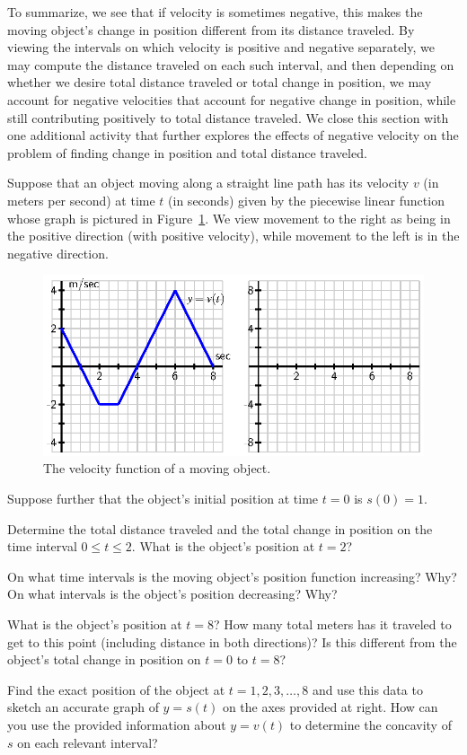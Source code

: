 To summarize, we see that if velocity is sometimes negative, this makes the moving object's change in position different from its distance traveled.  By viewing the intervals on which velocity is positive and negative separately, we may compute the distance traveled on each such interval, and then depending on whether we desire total distance traveled or total change in position, we may account for negative velocities that account for negative change in position, while still contributing positively to total distance traveled.  We close this section with one additional activity that further explores the effects of negative velocity on the problem of finding change in position and total distance traveled.

\begin{activity} \label{A:4.1.3}  Suppose that an object moving along a straight line path has its velocity $v$ (in meters per second) at time $t$ (in seconds) given by the piecewise linear function whose graph is pictured in Figure~\ref{F:4.1.Act3}.  We view movement to the right as being in the positive direction (with positive velocity), while movement to the left is in the negative direction.
\begin{figure}[h]
\begin{center}
\includegraphics{figures/4_1_Act3.eps}
\caption{The velocity function of a moving object.} \label{F:4.1.Act3}
\end{center}
\end{figure}
Suppose further that the object's initial position at time $t = 0$ is $s(0) = 1$.
\ba
	\item Determine the total distance traveled and the total change in position on the time interval $0 \le t \le 2$.  What is the object's position at $t = 2$?
	\item On what time intervals is the moving object's position function increasing?  Why?  On what intervals is the object's position decreasing?  Why?
	\item What is the object's position at $t = 8$?  How many total meters has it traveled to get to this point (including distance in both directions)?  Is this different from the object's total change in position on $t = 0$ to $t = 8$?
	\item Find the exact position of the object at $t = 1, 2, 3, \ldots, 8$ and use this data to sketch an accurate graph of $y = s(t)$ on the axes provided at right.  How can you use the provided information about $y = v(t)$ to determine the concavity of $s$ on each relevant interval?
\ea
\end{activity}
